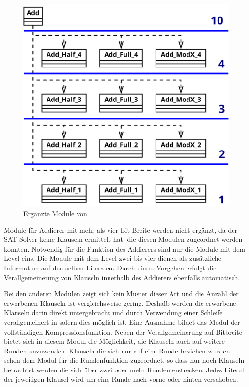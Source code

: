 \begin{figure}[!h]
  \centering
  \includegraphics[scale=0.265]{images/module_add}
  \caption{Ergänzte Module von }
  \label{fig:sha256_module_add}
\end{figure}

Module für Addierer mit mehr als vier Bit Breite werden nicht ergänzt, da der SAT-Solver keine Klauseln ermittelt hat, die diesen Modulen zugeordnet werden konnten.  
Notwendig für die Funktion des Addierers sind nur die Module mit dem Level eins. Die Module mit dem Level zwei bis vier dienen als zusätzliche Information
auf den selben Literalen. Durch dieses Vorgehen erfolgt die Verallgemeinerung von Klauseln innerhalb des Addierers ebenfalls automatisch.

Bei den anderen Modulen zeigt sich kein Muster dieser Art und die Anzahl der erworbenen Klauseln ist vergleichsweise gering. Deshalb werden die erworbene Klauseln
darin direkt untergebracht und durch Verwendung einer Schleife verallgemeinert in sofern dies möglich ist. Eine Ausnahme bildet das Modul der vollständigen
Kompressionsfunktion. Neben der Verallgemeinerung auf Bitbreite bietet sich in diesem Modul die Möglichkeit, die Klauseln auch auf weitere Runden anzuwenden.
Klauseln die sich nur auf eine Runde beziehen wurden schon dem Modul für die Rundenfunktion zugeordnet, so dass nur noch Klauseln betrachtet werden die sich über
zwei oder mehr Runden erstrecken. Jedes Literal der jeweiligen Klausel wird um eine Runde nach vorne oder hinten verschoben.

